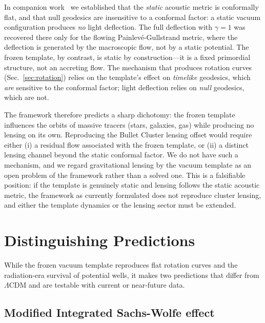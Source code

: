 \documentclass[12pt, a4paper]{article}
\begin{document}
In companion work~\cite{kulangiev_2026a} we established that the \emph{static} acoustic metric is conformally flat, and that null geodesics are insensitive to a conformal factor: a static vacuum configuration produces \emph{no} light deflection. The full deflection with $\gamma = 1$ was recovered there only for the flowing Painlev\'{e}-Gullstrand metric, where the deflection is generated by the macroscopic flow, not by a static potential. The frozen template, by contrast, is static by construction---it is a fixed primordial structure, not an accreting flow. The mechanism that produces rotation curves (Sec.~\ref{sec:rotation}) relies on the template's effect on \emph{timelike} geodesics, which \emph{are} sensitive to the conformal factor; light deflection relies on \emph{null} geodesics, which are not.

The framework therefore predicts a sharp dichotomy: the frozen template influences the orbits of massive tracers (stars, galaxies, gas) while producing no lensing on its own. Reproducing the Bullet Cluster lensing offset would require either (i) a residual flow associated with the frozen template, or (ii) a distinct lensing channel beyond the static conformal factor. We do not have such a mechanism, and we regard gravitational lensing by the vacuum template as an open problem of the framework rather than a solved one. This is a falsifiable position: if the template is genuinely static and lensing follows the static acoustic metric, the framework as currently formulated does not reproduce cluster lensing, and either the template dynamics or the lensing sector must be extended.


\section{Distinguishing Predictions}
\label{sec:predictions}

While the frozen vacuum template reproduces flat rotation curves and the radiation-era survival of potential wells, it makes two predictions that differ from $\Lambda$CDM and are testable with current or near-future data.

\subsection{Modified Integrated Sachs-Wolfe effect}
\end{document}
